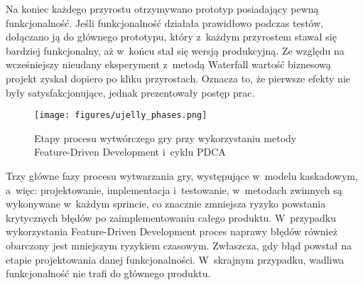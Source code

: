 Na koniec każdego przyrostu otrzymywano prototyp posiadający pewną funkcjonalność. Jeśli funkcjonalność działała prawidłowo podczas testów, dołączano ją do głównego prototypu, który z~każdym przyrostem stawał się bardziej funkcjonalny, aż w~końcu stał się wersją produkcyjną. Ze względu na wcześniejszy nieudany eksperyment z~metodą Waterfall wartość biznesową projekt zyskał dopiero po kliku przyrostach. Oznacza to, że pierwsze efekty nie były satysfakcjonujące, jednak prezentowały postęp prac. 

\begin{figure}
\begin{center}
\texttt{[image: figures/ujelly\_phases.png]}
\caption{Etapy procesu wytwórczego gry przy wykorzystaniu metody Feature-Driven Development i~cyklu PDCA}
\label{ujelly_phases}
\end{center}
\end{figure}

Trzy główne fazy procesu wytwarzania gry, występujące w~modelu kaskadowym, a~więc: projektowanie, implementacja i~testowanie, w~metodach zwinnych są wykonywane w~każdym sprincie, co znacznie zmniejsza ryzyko powstania krytycznych błędów po zaimplementowaniu całego produktu. W~przypadku wykorzystania Feature-Driven Development proces naprawy błędów również obarczony jest mniejszym ryzykiem czasowym. Zwłaszcza, gdy błąd powstał na etapie projektowania danej funkcjonalności. W~skrajnym przypadku, wadliwa funkcjonalność nie trafi do głównego produktu.
